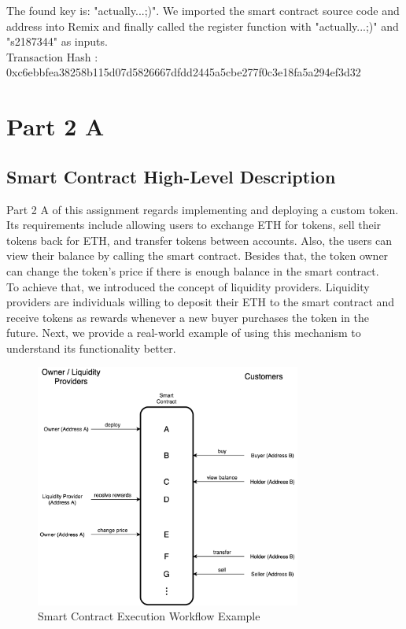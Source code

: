 \documentclass[12pt,a4paper]{article}
\begin{document}
\vspace{5mm}

The found key is: "actually...;)". We imported the smart contract source code
and address into Remix and finally called the register function with
"actually...;)" and "s2187344" as inputs. \\

Transaction Hash : 0xc6ebbfea38258b115d07d5826667dfdd2445a5cbe277f0c3e18fa5a294ef3d32

\section*{Part 2 A}

\subsection*{Smart Contract High-Level Description}

Part 2 A of this assignment regards implementing and deploying a custom token.
Its requirements include allowing users to exchange ETH for tokens, sell their
tokens back for ETH, and transfer tokens between accounts. Also, the users can
view their balance by calling the smart contract. Besides that, the token owner
can change the token's price if there is enough balance in the smart contract. \\

To achieve that, we introduced the concept of liquidity providers. Liquidity
providers are individuals willing to deposit their ETH to the smart contract and
receive tokens as rewards whenever a new buyer purchases the token in the
future. Next, we provide a real-world example of using this mechanism to
understand its functionality better. \\

\begin{figure}[htpb]
    \begin{center}
        \includegraphics[height=8cm]{execution_flow.png}
        \caption{Smart Contract Execution Workflow Example}
        \label{fig:smart-contract-example}
    \end{center}
\end{figure} 
\end{document}
